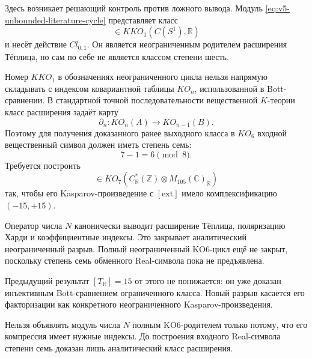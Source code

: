Здесь возникает решающий контроль против ложного вывода. Модуль
\eqref{eq:v5-unbounded-literature-cycle} представляет класс
\begin{equation}
 [\mathrm{ext}]\in KKO_1(C(S^1),\mathbb R)
\end{equation}
и несёт действие $Cl_{0,1}$. Он является неограниченным родителем
расширения Тёплица, но сам по себе не является классом степени шесть.

Номер $KKO_1$ в обозначениях неограниченного цикла нельзя напрямую
складывать с индексом ковариантной таблицы $KO_n$, использованной в
Bott-сравнении. В стандартной точной последовательности вещественной
$K$-теории класс расширения задаёт карту
\begin{equation}
 \partial_n:KO_n(A)\longrightarrow KO_{n-1}(B).
\end{equation}
Поэтому для получения доказанного ранее выходного класса в $KO_6$
входной вещественный символ должен иметь степень семь:
\begin{equation}
 7-1=6\pmod 8.
 \label{eq:v5-unbounded-degree-ledger}
\end{equation}
Требуется построить
\begin{equation}
 [u_{\mathbb R},q_0]\in KO_7(C^*_{\mathbb R}(\mathbb Z)\otimes
 M_{105}(\mathbb C)_{\mathbb R})
\end{equation}
так, чтобы его Kasparov-произведение с $[\mathrm{ext}]$ имело
комплексификацию $(-15,+15)$.

\begin{theorem}
Оператор числа $N$ канонически выводит расширение Тёплица, поляризацию
Харди и коэффициентные индексы. Это закрывает аналитический
неограниченный разрыв. Полный неограниченный KO6-цикл ещё не закрыт,
поскольку степень семь обменного Real-символа пока не предъявлена.
\end{theorem}

Предыдущий результат $[T_{\mathbb R}]=15$ от этого не понижается: он уже
доказан инъективным Bott-сравнением ограниченного класса. Новый разрыв
касается его факторизации как конкретного неограниченного
Kasparov-произведения.

\begin{nogocriterion}
Нельзя объявлять модуль числа $N$ полным KO6-родителем только потому, что
его компрессия имеет нужные индексы. До построения входного Real-символа
степени семь доказан лишь аналитический класс расширения.
\end{nogocriterion}

